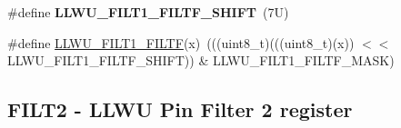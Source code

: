 \begin{DoxyCompactItemize}
\item 
\mbox{\label{group___l_l_w_u___register___masks_ga359dd7a99c209dc7c2f26d79c061d11e}} 
\#define {\bfseries L\+L\+W\+U\+\_\+\+F\+I\+L\+T1\+\_\+\+F\+I\+L\+T\+F\+\_\+\+S\+H\+I\+FT}~(7\+U)
\item 
\#define \mbox{\hyperlink{group___l_l_w_u___register___masks_ga178c6ff91d71caeb12b9444cd028e09d}{L\+L\+W\+U\+\_\+\+F\+I\+L\+T1\+\_\+\+F\+I\+L\+TF}}(x)~(((uint8\+\_\+t)(((uint8\+\_\+t)(x)) $<$$<$ L\+L\+W\+U\+\_\+\+F\+I\+L\+T1\+\_\+\+F\+I\+L\+T\+F\+\_\+\+S\+H\+I\+FT)) \& L\+L\+W\+U\+\_\+\+F\+I\+L\+T1\+\_\+\+F\+I\+L\+T\+F\+\_\+\+M\+A\+SK)
\end{DoxyCompactItemize}
\subsection*{F\+I\+L\+T2 -\/ L\+L\+WU Pin Filter 2 register}
